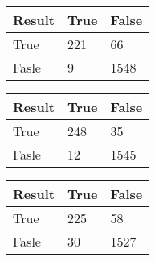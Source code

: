\begin{tabular}{|l|l l|}
\hline
Result & True & False \\
\hline
True & 221 & 66 \\
Fasle & 9 & 1548 \\
\hline
\end{tabular}
\begin{tabular}{|l|l l|}
\hline
Result & True & False \\
\hline
True & 248 & 35 \\
Fasle & 12 & 1545 \\
\hline
\end{tabular}
\begin{tabular}{|l|l l|}
\hline
Result & True & False \\
\hline
True & 225 & 58 \\
Fasle & 30 & 1527 \\
\hline
\end{tabular}
